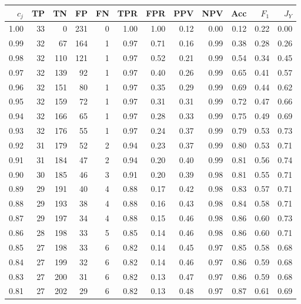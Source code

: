 \begin{table}[ht]
\centering
{}
\captionsetup{font=scriptsize}
\begingroup\tiny
\begin{tabular}{r|rrrrrrrrrrr}
  $c_j$ & TP & TN & FP & FN & TPR & FPR & PPV & NPV & Acc & $F_1$ & $J_Y$ \\ 
  \hline
  1.00 & 33 & 0 & 231 & 0 & 1.00 & 1.00 & 0.12 & 0.00 & 0.12 & 0.22 & 0.00 \\ 
  0.99 & 32 & 67 & 164 & 1 & 0.97 & 0.71 & 0.16 & 0.99 & 0.38 & 0.28 & 0.26 \\ 
  0.98 & 32 & 110 & 121 & 1 & 0.97 & 0.52 & 0.21 & 0.99 & 0.54 & 0.34 & 0.45 \\ 
  0.97 & 32 & 139 & 92 & 1 & 0.97 & 0.40 & 0.26 & 0.99 & 0.65 & 0.41 & 0.57 \\ 
  0.96 & 32 & 151 & 80 & 1 & 0.97 & 0.35 & 0.29 & 0.99 & 0.69 & 0.44 & 0.62 \\ 
  0.95 & 32 & 159 & 72 & 1 & 0.97 & 0.31 & 0.31 & 0.99 & 0.72 & 0.47 & 0.66 \\ 
  0.94 & 32 & 166 & 65 & 1 & 0.97 & 0.28 & 0.33 & 0.99 & 0.75 & 0.49 & 0.69 \\ 
  0.93 & 32 & 176 & 55 & 1 & 0.97 & 0.24 & 0.37 & 0.99 & 0.79 & 0.53 & 0.73 \\ 
  0.92 & 31 & 179 & 52 & 2 & 0.94 & 0.23 & 0.37 & 0.99 & 0.80 & 0.53 & 0.71 \\ 
  0.91 & 31 & 184 & 47 & 2 & 0.94 & 0.20 & 0.40 & 0.99 & 0.81 & 0.56 & 0.74 \\ 
  0.90 & 30 & 185 & 46 & 3 & 0.91 & 0.20 & 0.39 & 0.98 & 0.81 & 0.55 & 0.71 \\ 
  0.89 & 29 & 191 & 40 & 4 & 0.88 & 0.17 & 0.42 & 0.98 & 0.83 & 0.57 & 0.71 \\ 
  0.88 & 29 & 193 & 38 & 4 & 0.88 & 0.16 & 0.43 & 0.98 & 0.84 & 0.58 & 0.71 \\ 
  0.87 & 29 & 197 & 34 & 4 & 0.88 & 0.15 & 0.46 & 0.98 & 0.86 & 0.60 & 0.73 \\ 
  0.86 & 28 & 198 & 33 & 5 & 0.85 & 0.14 & 0.46 & 0.98 & 0.86 & 0.60 & 0.71 \\ 
  0.85 & 27 & 198 & 33 & 6 & 0.82 & 0.14 & 0.45 & 0.97 & 0.85 & 0.58 & 0.68 \\ 
  0.84 & 27 & 199 & 32 & 6 & 0.82 & 0.14 & 0.46 & 0.97 & 0.86 & 0.59 & 0.68 \\ 
  0.83 & 27 & 200 & 31 & 6 & 0.82 & 0.13 & 0.47 & 0.97 & 0.86 & 0.59 & 0.68 \\ 
  0.81 & 27 & 202 & 29 & 6 & 0.82 & 0.13 & 0.48 & 0.97 & 0.87 & 0.61 & 0.69 \\ 

\end{tabular}
\end{table}
